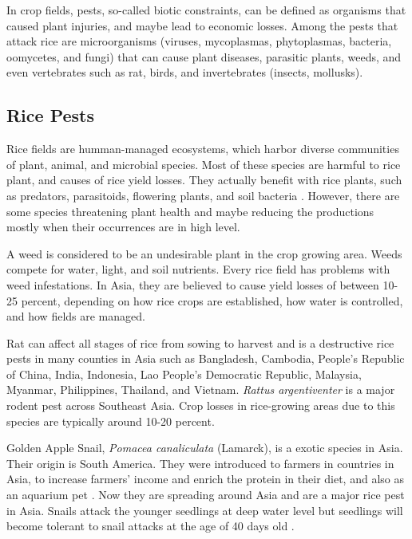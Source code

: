 In crop fields, pests, so-called biotic constraints, can be defined as organisms that caused plant injuries, and maybe lead to economic losses. Among the pests that attack rice are microorganisms (viruses, mycoplasmas, phytoplasmas, bacteria, oomycetes, and fungi) that can cause plant diseases, parasitic plants, weeds, and even vertebrates such as rat, birds, and invertebrates (insects, mollusks). %
\newpage

\subsection*{Rice Pests}

Rice fields are humman-managed ecosystems, which harbor diverse communities of plant, animal, and microbial species. Most of these species are harmful to rice plant, and causes of rice yield losses. They actually benefit with rice plants, such as predators, parasitoids, flowering plants, and soil bacteria \citep{norton2010rice}. However, there are some species threatening plant health and maybe reducing the productions mostly when their occurrences are in high level. 

A weed is considered to be an undesirable plant in the crop growing area. Weeds compete for water, light, and soil nutrients. Every rice field has problems with weed infestations. In Asia, they are believed to cause yield losses of between 10-25 percent, depending on how rice crops are established, how water is controlled, and how fields are managed.

Rat can affect all stages of rice from sowing to harvest and is a destructive rice pests in many counties in Asia such as Bangladesh, Cambodia, People's Republic of China, India, Indonesia, Lao People's Democratic Republic, Malaysia, Myanmar, Philippines, Thailand, and Vietnam. \textit{Rattus argentiventer} is a major rodent pest across Southeast Asia. Crop losses in rice-growing areas due to this species are typically around 10-20 percent. 

Golden Apple Snail, \textit{Pomacea canaliculata} (Lamarck), is a exotic species in Asia. Their origin is South America. They were introduced to farmers in countries in Asia, to increase farmers' income and enrich the protein in their diet, and also as an aquarium pet \citep{joshi2007problems}. Now they are spreading around Asia and are a major rice pest in Asia. Snails attack the younger seedlings at deep water level but seedlings will become tolerant to snail attacks at the age of 40 days old \citep{sin2003damage}.

